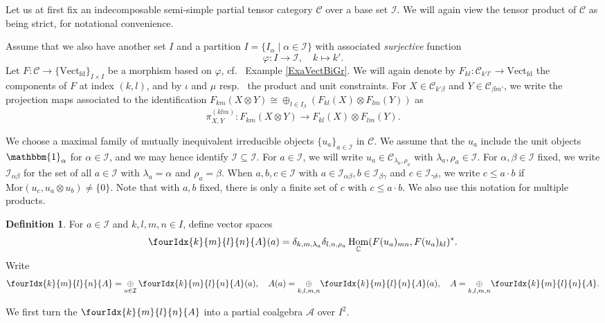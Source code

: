 \documentclass[10pt]{article}
\DeclareMathOperator{\fin}{\mathrm{fd}}
\DeclareMathOperator{\Hom}{Hom}
\newcommand{\C}{\mathbb{C}}
\newcommand{\CatC}{\mathcal{C}}
\newcommand{\CatCC}{\mathscr{C}}
\newcommand{\Mor}{\mathrm{Mor}}
\newcommand{\Vect}{\mathrm{Vect}}
\newcommand{\Unitb}{\mathbbm{1}}
\newcommand{\Gr}[5]{\fourIdx{#2}{#4}{#3}{#5}{#1}}%
\theoremstyle{definition}
\newtheorem{Def}[Theorem]{Definition}
\numberwithin{equation}{section}
\begin{document}
Let us at first fix an indecomposable semi-simple partial tensor category $\CatCC$ over a base set $\mathscr{I}$. We will again view the tensor product of $\CatC$ as being strict, for notational convenience. 

Assume that we also have another set $I$ and a partition $I = \{I_\alpha\mid \alpha\in \mathscr{I}\}$ with associated \emph{surjective} function \[\varphi:I\rightarrow \mathscr{I}, \quad k\mapsto k'.\] Let $F: \CatCC\rightarrow \{\Vect_{\fin}\}_{I\times I}$ be a morphism based on $\varphi$, cf.~ Example \ref{ExaVectBiGr}.  We will again denote by $F_{kl}:\CatCC_{k'l'}\rightarrow \Vect_{\fin}$ the components of $F$ at index $(k,l)$, and by $\iota$ and $\mu$ resp.~ the product and unit constraints.  For $X\in \CatC_{k'\beta}$ and $Y\in \CatC_{\beta m'}$, we write the projection maps associated to the identification $F_{km}(X\otimes Y)\cong \oplus_{l\in I_\beta} \left(F_{kl}(X)\otimes F_{lm}(Y)\right)$ as \[\pi^{(klm)}_{X,Y}:F_{km}(X\otimes Y) \rightarrow F_{kl}(X)\otimes F_{lm}(Y).\]

We choose a maximal family of mutually inequivalent irreducible objects $\{u_a\}_{a\in \mathcal{I}}$ in $\CatC$. We assume that the $u_a$ include the unit objects $\Unitb_{\alpha}$ for $\alpha\in \mathscr{I}$, and we may hence identify $\mathscr{I}\subseteq \mathcal{I}$. For $a\in \mathcal{I}$, we will write $u_a \in \CatC_{\lambda_a,\rho_a}$ with $\lambda_a,\rho_a\in \mathscr{I}$. For $\alpha,\beta\in \mathscr{I}$ fixed, we write $\mathcal{I}_{\alpha\beta}$ for the set of all $a\in \mathcal{I}$ with $\lambda_a=\alpha$ and $\rho_a=\beta$. When $a,b,c\in \mathcal{I}$ with $a\in \mathcal{I}_{\alpha\beta},b\in \mathcal{I}_{\beta\gamma}$ and $c\in \mathcal{I}_{\gamma\delta}$, we write $c\leq a\cdot b$ if $\Mor(u_c,u_a\otimes u_b)\neq \{0\}$. Note that with $a,b$ fixed, there is only a finite set of $c$ with $c\leq a\cdot b$. We also use this notation for multiple products.

\begin{Def} For $a\in \mathcal{I}$ and $k,l,m,n\in I$, define vector spaces \[\Gr{A}{k}{l}{m}{n}(a) =  \delta_{k,m,\lambda_a}\delta_{l,n,\rho_a} \Hom_{\C}(F(u_a)_{mn},F(u_a)_{kl})^*.\] Write \[\Gr{A}{k}{l}{m}{n} =\underset{a\in \mathcal{I}}{\oplus}\, \Gr{A}{k}{l}{m}{n}(a),\quad A(a) = \underset{k,l,m,n}{\oplus} \Gr{A}{k}{l}{m}{n}(a),\quad A = \underset{k,l,m,n}{\oplus} \Gr{A}{k}{l}{m}{n}.\] 
\end{Def} 

We first turn the $\Gr{A}{k}{l}{m}{n}$ into a partial coalgebra $\mathscr{A}$ over $I^2$.
\end{document}
